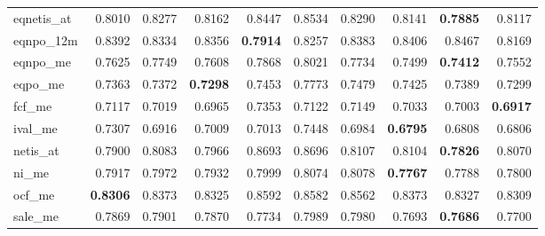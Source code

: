 \begin{longtable}{>{\raggedright\arraybackslash}p{2.6cm}rrrrrrrrr}
eqnetis\_at & 0.8010 & 0.8277 & 0.8162 & 0.8447 & 0.8534 & 0.8290 & 0.8141 & \textbf{\cellcolor{blue!10}0.7885} & 0.8117 \\
eqnpo\_12m & 0.8392 & \cellcolor{blue!10}0.8334 & \cellcolor{blue!10}0.8356 & \textbf{\cellcolor{blue!10}0.7914} & \cellcolor{blue!10}0.8257 & \cellcolor{blue!10}0.8383 & 0.8406 & 0.8467 & \cellcolor{blue!10}0.8169 \\
eqnpo\_me & 0.7625 & 0.7749 & \cellcolor{blue!10}0.7608 & 0.7868 & 0.8021 & 0.7734 & \cellcolor{blue!10}0.7499 & \textbf{\cellcolor{blue!10}0.7412} & \cellcolor{blue!10}0.7552 \\
eqpo\_me & 0.7363 & 0.7372 & \textbf{\cellcolor{blue!10}0.7298} & 0.7453 & 0.7773 & 0.7479 & 0.7425 & 0.7389 & \cellcolor{blue!10}0.7299 \\
fcf\_me & 0.7117 & \cellcolor{blue!10}0.7019 & \cellcolor{blue!10}0.6965 & 0.7353 & 0.7122 & 0.7149 & \cellcolor{blue!10}0.7033 & \cellcolor{blue!10}0.7003 & \textbf{\cellcolor{blue!10}0.6917} \\
ival\_me & 0.7307 & \cellcolor{blue!10}0.6916 & \cellcolor{blue!10}0.7009 & \cellcolor{blue!10}0.7013 & 0.7448 & \cellcolor{blue!10}0.6984 & \textbf{\cellcolor{blue!10}0.6795} & \cellcolor{blue!10}0.6808 & \cellcolor{blue!10}0.6806 \\
netis\_at & 0.7900 & 0.8083 & 0.7966 & 0.8693 & 0.8696 & 0.8107 & 0.8104 & \textbf{\cellcolor{blue!10}0.7826} & 0.8070 \\
ni\_me & 0.7917 & 0.7972 & 0.7932 & 0.7999 & 0.8074 & 0.8078 & \textbf{\cellcolor{blue!10}0.7767} & \cellcolor{blue!10}0.7788 & \cellcolor{blue!10}0.7800 \\
ocf\_me & \textbf{0.8306} & 0.8373 & 0.8325 & 0.8592 & 0.8582 & 0.8562 & 0.8373 & 0.8327 & 0.8309 \\
sale\_me & 0.7869 & 0.7901 & 0.7870 & \cellcolor{blue!10}0.7734 & 0.7989 & 0.7980 & \cellcolor{blue!10}0.7693 & \textbf{\cellcolor{blue!10}0.7686} & \cellcolor{blue!10}0.7700 \\
\hline
\end{longtable}
\endgroup
